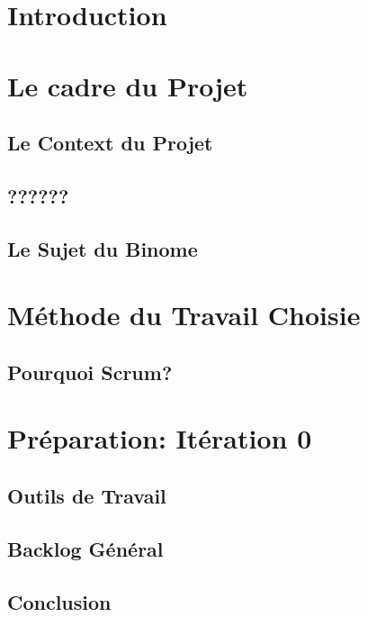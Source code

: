 \section*{Introduction}

\section{Le cadre du Projet}

\subsection{Le Context du Projet}

\subsection{??????}

\subsection{Le Sujet du Binome}


\section{Méthode du Travail Choisie}


\subsection*{Pourquoi Scrum?}

\section{Préparation: Itération 0}

\subsection{Outils de Travail}

\subsection{Backlog Général}

\subsection{Conclusion}


